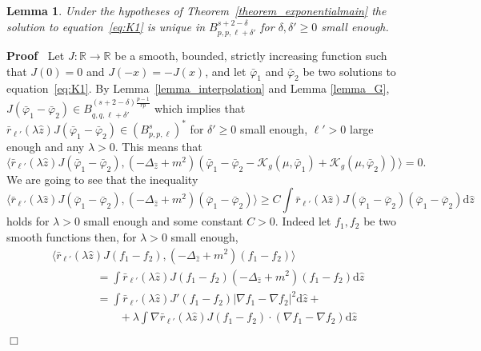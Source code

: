 \documentclass[a4paper,10pt]{article}
\newcommand{\asterisk}{\mathord{*}}
\newcommand{\mathd}{\mathrm{d}}
\newenvironment{proof}{\noindent\textbf{Proof\ }}{\hspace*{\fill}$\Box$\medskip}
\newtheorem{lemma}[theorem]{Lemma}
\begin{document}
\begin{lemma}
  \label{lemma_exponentialuniqueness}Under the hypotheses of
  Theorem~\ref{theorem_exponentialmain} the solution to
  equation~{\eqref{eq:K1}} is unique in $B^{s + 2 - \delta}_{p, p, \ell +
  \delta'}$ for $\delta, \delta' \geqslant 0$ small enough.
\end{lemma}

\begin{proof}
  Let $J : \mathbb{R} \rightarrow \mathbb{R}$ be a smooth, bounded, strictly
  increasing function such that $J (0) = 0$ and $J (- x) = - J (x)$, and let
  $\bar{\varphi}_1$ and $\bar{\varphi}_2$ be two solutions to
  equation~{\eqref{eq:K1}}. By Lemma~\ref{lemma_interpolation} and Lemma
  \ref{lemma_G}, $J (\bar{\varphi}_1 - \bar{\varphi}_2) \in B^{(s + 2 -
  \delta) \frac{p - 1}{r p}}_{q, q, \ell + \delta'}$ which implies that
  $\bar{r}_{\ell'} (\lambda \hat{z}) J (\bar{\varphi}_1 - \bar{\varphi}_2) \in
  (B^s_{p, p, \ell})^{\asterisk}$ for $\delta' \geqslant 0$ small enough,
  $\ell' > 0$ large enough and any $\lambda > 0$. This means that
  \[ \langle \bar{r}_{\ell'} (\lambda \hat{z}) J (\bar{\varphi}_1 -
     \bar{\varphi}_2), (- \Delta_{\hat{z}} + m^2) (\bar{\varphi}_1 -
     \bar{\varphi}_2 - \mathcal{K}_g (\mu, \bar{\varphi}_1) + \mathcal{K}_g
     (\mu, \bar{\varphi}_2)) \rangle = 0. \]
  We are going to see that the inequality
  \[ \langle \bar{r}_{\ell'} (\lambda \hat{z}) J (\bar{\varphi}_1 -
     \bar{\varphi}_2), (- \Delta_{\hat{z}} + m^2) (\bar{\varphi}_1 -
     \bar{\varphi}_2) \rangle \geqslant C \int \bar{r}_{\ell'} (\lambda
     \hat{z}) J (\bar{\varphi}_1 - \bar{\varphi}_2) (\bar{\varphi}_1 -
     \bar{\varphi}_2) \mathd \hat{z} \]
  holds for $\lambda > 0$ small enough and some constant $C > 0$. Indeed let
  $f_1, f_2$ be two smooth functions then, for $\lambda > 0$ small enough,
  \[ \begin{array}{l}
       \langle \bar{r}_{\ell'} (\lambda \hat{z}) J (f_1 - f_2), (-
       \Delta_{\hat{z}} + m^2) (f_1 - f_2) \rangle\\
       \qquad \qquad = \int \bar{r}_{\ell'} (\lambda \hat{z}) J (f_1 - f_2) (-
       \Delta_{\hat{z}} + m^2) (f_1 - f_2) \mathd \hat{z}\\
       \qquad \qquad = \int \bar{r}_{\ell'} (\lambda \hat{z}) J' (f_1 - f_2) |
       \nabla f_1 - \nabla f_2 |^2 \mathd \hat{z} +\\
       \qquad \hspace{4em} + \lambda \int \nabla \bar{r}_{\ell'} (\lambda
       \hat{z}) J (f_1 - f_2) \cdot (\nabla f_1 - \nabla f_2) \mathd \hat{z}\\

\end{array}\]
\end{proof}
\end{document}
